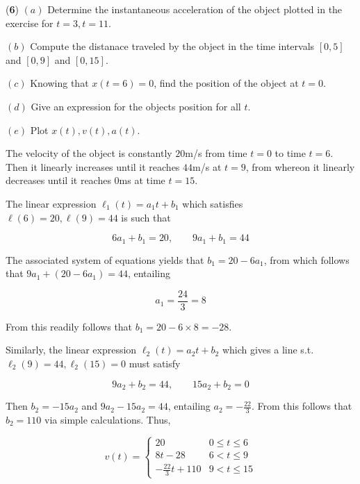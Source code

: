 \documentclass[12pt]{article}
\theoremstyle{definition}
\begin{document}
\pagebreak 

\begin{shaded}
    (\textbf{6}) $(a)$ Determine the instantaneous acceleration of the object
    plotted in the exercise for $t = 3, t = 11$.

    $(b)$ Compute the distanace traveled by the object in the time intervals
    $[0, 5]$ and $[0, 9]$ and $[0, 15]$.

    $(c)$ Knowing that $x(t = 6) = 0$, find the position of the object at $t =
    0$. 

    $(d)$ Give an expression for the objects position for all $t$. 

    $(e)$ Plot $x(t), v(t), a(t)$.
\end{shaded}

The velocity of the object is constantly $20$m/s from time $t = 0$ to time $t =
6$. Then it linearly increases until it reaches $44$m/s at $t=9$, from whereon
it linearly decreases until it reaches $0$ms at time $t = 15$.

The linear expression $\ell_1(t) = a_1t + b_1$ which satisfies $\ell(6)=20,
\ell(9) = 44$ is such that 

\begin{equation*}
    6a_1 + b_1 = 20, \qquad 9a_1 + b_1 = 44
\end{equation*}

The associated system of equations yields that $b_1 = 20 - 6a_1$, from which
follows that $9a_1 + (20 - 6a_1) = 44$, entailing 

\begin{equation*}
    a_1 = \frac{24}{3} = 8
\end{equation*}

From this readily follows that $b_1 = 20 - 6\times 8 = -28$. 

Similarly, the linear expression $\ell_2(t) = a_2t + b_2$ which gives a line
s.t. $\ell_2(9) = 44, \ell_2(15) = 0$ must satisfy 

\begin{equation*}
    9a_2 + b_2 = 44, \qquad 15a_2 + b_2 = 0
\end{equation*}

Then $b_2 = -15a_2$ and $9a_2 -15a_2 = 44$, entailing $a_2 = -\frac{22}{3}$.
From this follows that $b_2 = 110$ via simple calculations. Thus, 


\begin{equation*}
    v(t) = \begin{cases}
        20 & 0 \leq t \leq 6 \\ 
        8t - 28 & 6 < t \leq 9 \\ 
        -\frac{22}{3}t + 110 & 9 < t \leq 15
    \end{cases}
\end{equation*}
\end{document}
